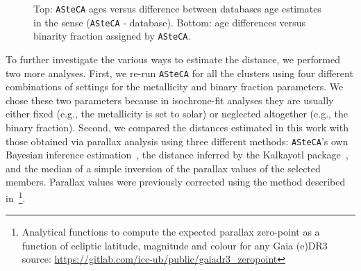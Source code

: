 \documentclass[referee]{aa}
\begin{document}
  \begin{figure}
   \caption{Top: \texttt{ASteCA} ages versus difference between databases age
   estimates in the sense (\texttt{ASteCA} - database).
   Bottom: age differences versus binarity fraction assigned by
   \texttt{ASteCA}.}
   \label{fig:ages}
  \end{figure}


  To further investigate the various ways to estimate the distance, we performed
  two more analyses. First, we re-run \texttt{ASteCA} for all the
  clusters using four different combinations of settings for the metallicity and
  binary fraction parameters. We chose these two parameters because in
  isochrone-fit analyses they are usually either fixed (e.g., the metallicity is
  set to solar) or neglected altogether (e.g., the binary fraction).
  Second, we compared the distances estimated in this work with those obtained
  via parallax analysis using three different methods: \texttt{ASteCA}'s own
  Bayesian inference estimation~\citep[described in][]{Perren_2020}, the
  distance inferred by the Kalkayotl package~\citep{Kalkayotl}, and the median
  of a simple inversion of the parallax values of the selected members.
  Parallax values were previously corrected using the method described
  in~\cite{Lindegren_2021}\footnote{ Analytical functions to compute the
  expected parallax zero-point as a function of ecliptic latitude, magnitude and
  colour for any Gaia (e)DR3
  source: \url{https://gitlab.com/icc-ub/public/gaiadr3_zeropoint}}.\\
\end{document}
